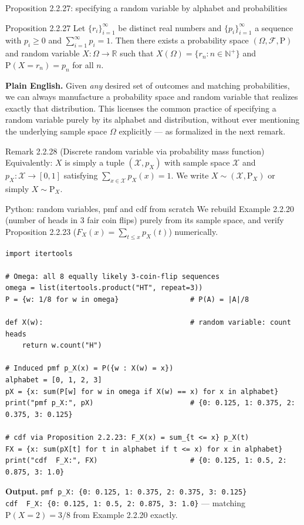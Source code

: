 \documentclass[aspectratio=169,10pt]{beamer}
\begin{document}
\begin{frame}{Proposition 2.2.27: specifying a random variable by alphabet and probabilities}
\begin{block}{Proposition 2.2.27}
Let $\{r_i\}_{i=1}^{\infty}$ be distinct real numbers and $\{p_i\}_{i=1}^{\infty}$
a sequence with $p_i\geq 0$ and $\sum_{i=1}^{\infty}p_i=1$. Then there exists a
probability space $(\Omega,\mathcal{F},\mathrm{P})$ and random variable
$X:\Omega\to\mathbb{R}$ such that $X(\Omega)=\{r_n : n\in\mathbb{N}^+\}$ and
$\mathrm{P}(X=r_n)=p_n$ for all $n$.
\end{block}
\textbf{Plain English.} Given \emph{any} desired set of outcomes and matching
probabilities, we can always manufacture a probability space and random
variable that realizes exactly that distribution. This licenses the common
practice of specifying a random variable purely by its alphabet and
distribution, without ever mentioning the underlying sample space $\Omega$
explicitly --- as formalized in the next remark.

\begin{block}{Remark 2.2.28 (Discrete random variable via probability mass function)}
Equivalently: $X$ is simply a tuple $(\mathcal{X},p_X)$ with sample space
$\mathcal{X}$ and $p_X:\mathcal{X}\to[0,1]$ satisfying
$\sum_{x\in\mathcal{X}}p_X(x)=1$. We write $X\sim(\mathcal{X},\mathrm{P}_X)$
or simply $X\sim\mathrm{P}_X$.
\end{block}
\end{frame}

\begin{frame}[fragile]{Python: random variables, pmf and cdf from scratch}
We rebuild Example 2.2.20 (number of heads in 3 fair coin flips) purely from
its sample space, and verify Proposition 2.2.23 ($F_X(x)=\sum_{t\leq x}p_X(t)$)
numerically.
\begin{lstlisting}
import itertools

# Omega: all 8 equally likely 3-coin-flip sequences
omega = list(itertools.product("HT", repeat=3))
P = {w: 1/8 for w in omega}                 # P(A) = |A|/8

def X(w):                                   # random variable: count heads
    return w.count("H")

# Induced pmf p_X(x) = P({w : X(w) = x})
alphabet = [0, 1, 2, 3]
pX = {x: sum(P[w] for w in omega if X(w) == x) for x in alphabet}
print("pmf p_X:", pX)                       # {0: 0.125, 1: 0.375, 2: 0.375, 3: 0.125}

# cdf via Proposition 2.2.23: F_X(x) = sum_{t <= x} p_X(t)
FX = {x: sum(pX[t] for t in alphabet if t <= x) for x in alphabet}
print("cdf  F_X:", FX)                      # {0: 0.125, 1: 0.5, 2: 0.875, 3: 1.0}
\end{lstlisting}
\textbf{Output.} \texttt{pmf p\_X: \{0: 0.125, 1: 0.375, 2: 0.375, 3: 0.125\}} \\
\texttt{cdf\ \ F\_X: \{0: 0.125, 1: 0.5, 2: 0.875, 3: 1.0\}} --- matching
$\mathrm{P}(X=2)=3/8$ from Example 2.2.20 exactly.
\end{frame}
\end{document}
